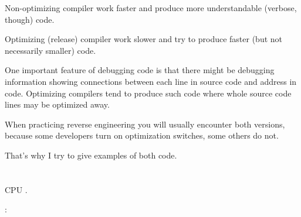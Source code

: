 Non-optimizing compiler work faster and produce more understandable (verbose, though) code.

Optimizing (release) compiler work slower and try to produce faster (but not necessarily smaller) code.

One important feature of debugging code is that there might be debugging information showing connections
between each line in source code and address in code.
Optimizing compilers tend to produce such code where whole source code lines may be optimized away.

When practicing reverse engineering you will usually encounter both versions, because some developers turn on optimization
switches, some others do not.

That's why I try to give examples of both code.

\fi

\chapter{}

 \ac{CPU} .

:

